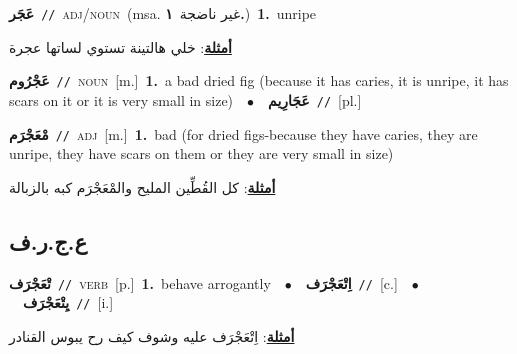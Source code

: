 \documentclass[10pt,a4paper,twoside]{article} %
\begin{document}
\begin{multicols}{2}
{\setlength\topsep{0pt}\textbf{\foreignlanguage{arabic}{عَجَر}}\ {\color{gray}\texttt{//}\color{black}}\ \textsc{adj/noun}\ \color{gray}(msa. \foreignlanguage{arabic}{غير ناضجة}~\foreignlanguage{arabic}{\textbf{١.}})\color{black}\ \textbf{1.}~unripe\  \begin{flushright}\color{gray}\foreignlanguage{arabic}{\textbf{\underline{\foreignlanguage{arabic}{أمثلة}}}: خلي هالتينة تستوي لساتها عجرة}\end{flushright}\color{black}} \vspace{2mm}

{\setlength\topsep{0pt}\textbf{\foreignlanguage{arabic}{عَجْرُوم}}\ {\color{gray}\texttt{//}\color{black}}\ \textsc{noun}\ [m.]\ \textbf{1.}~a bad dried fig (because it has caries, it is unripe, it has scars on it or it is very small in size)\ \ $\bullet$\ \ \setlength\topsep{0pt}\textbf{\foreignlanguage{arabic}{عَجَارِيم}}\ {\color{gray}\texttt{//}\color{black}}\ [pl.]\ } \vspace{2mm}

{\setlength\topsep{0pt}\textbf{\foreignlanguage{arabic}{مْعَجْرَم}}\ {\color{gray}\texttt{//}\color{black}}\ \textsc{adj}\ [m.]\ \textbf{1.}~bad (for dried figs-because they have caries, they are unripe, they have scars on them or they are very small in size)\  \begin{flushright}\color{gray}\foreignlanguage{arabic}{\textbf{\underline{\foreignlanguage{arabic}{أمثلة}}}: كل القُطِّين المليح والمْعَجْرَم كبه بالزبالة}\end{flushright}\color{black}} \vspace{2mm}

\vspace{-3mm}
\subsection*{\color{blue}\foreignlanguage{arabic}{ع.ج.ر.ف}\color{blue}{}} 

{\setlength\topsep{0pt}\textbf{\foreignlanguage{arabic}{تْعَجْرَف}}\ {\color{gray}\texttt{//}\color{black}}\ \textsc{verb}\ [p.]\ \textbf{1.}~behave arrogantly\ \ $\bullet$\ \ \setlength\topsep{0pt}\textbf{\foreignlanguage{arabic}{اِتْعَجْرَف}}\ {\color{gray}\texttt{//}\color{black}}\ [c.]\ \ $\bullet$\ \ \setlength\topsep{0pt}\textbf{\foreignlanguage{arabic}{يِتْعَجْرَف}}\ {\color{gray}\texttt{//}\color{black}}\ [i.]\  \begin{flushright}\color{gray}\foreignlanguage{arabic}{\textbf{\underline{\foreignlanguage{arabic}{أمثلة}}}: اِتْعَجْرَف عليه وشوف كيف رح يبوس القنادر}\end{flushright}\color{black}} \vspace{2mm}


\end{multicols}
\end{document}
